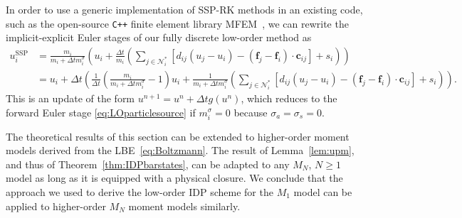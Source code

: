 \documentclass[preprint, 11pt]{elsarticle}
\newcommand{\N}{\mathcal{N}}
\newcommand{\f}{\mathbf{f}}
\newcommand{\con}{\mathbf{c}}
\begin{document}
\begin{remark}
    In order to use a generic implementation of SSP-RK methods in an existing code, such as the open-source \texttt{C++} finite element library MFEM~\cite{anderson2021,andrej2024,mfem}, we can rewrite the implicit-explicit Euler stages of our fully discrete low-order method as
    \begin{align*}
        u_i^{\mathrm{SSP}} &= \frac{m_i}{m_i + \Delta t m_i^{\sigma}} \left( u_i + \frac{\Delta t }{m_i}\left(\sum_{j\in\N_i^*}[ d_{ij} (u_j -u_i) - (\f_j -\f_i)\cdot \con_{ij}] + s_i\right)\right)\\
        & = u_i + \Delta t \left(\frac{1}{\Delta t} \left(\frac{m_i}{m_i + \Delta t m_i^{\sigma}} -1 \right) u_i + \frac{1}{m_i + \Delta t m_i^{\sigma}} \left(\sum_{j\in\N_i^*}[ d_{ij} (u_j -u_i) - (\f_j -\f_i)\cdot \con_{ij}]  +     s_i\right)\right).
    \end{align*}
   This is an update of the form $u^{n+1} = u^n +\Delta t g(u^n)$, which 
   reduces to the forward Euler stage \eqref{eq:LOparticlesource}
   if $m_i^{\sigma}=0$ because $\sigma_a = \sigma_s = 0$.
\end{remark}

\begin{remark}
    The theoretical results of this section can be extended to higher-order moment models derived from the LBE~\eqref{eq:Boltzmann}.
    The result of Lemma~\ref{lem:upm}, and thus of Theorem~\ref{thm:IDPbarstates}, can be adapted to any $M_N$, $N\geq 1$ model as long as it is equipped with a physical closure. 
    We conclude that the approach we used to derive the low-order IDP scheme for the $M_1$ model can  be applied to higher-order $M_N$ moment models similarly.
\end{remark}



\end{document}
